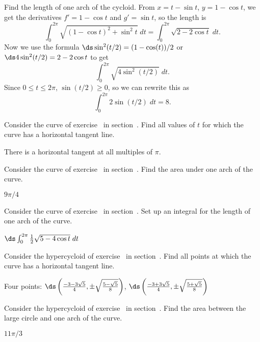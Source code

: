 \begin{example} Find the length of one arch of the cycloid.
From $x=t-\sin t$, $y=1-\cos t$, we get the derivatives
$f'=1-\cos t$ and $g'=\sin t$, so the length is 
$$
  \int_0^{2\pi} \sqrt{(1-\cos t)^2+\sin^2 t}\;dt=
  \int_0^{2\pi} \sqrt{2-2\cos t}\;dt.
$$
Now we use the formula $\ds \sin^2(t/2)=(1-\cos(t))/2$ or
$\ds 4\sin^2(t/2)=2-2\cos t$ to get
$$\int_0^{2\pi} \sqrt{4\sin^2(t/2)}\;dt.$$
Since $0\le t\le2\pi$, $\sin(t/2)\ge 0$, so we can rewrite this as
$$\int_0^{2\pi} 2\sin(t/2)\;dt = 8.$$
\end{example}

\begin{exercises}

\exercise Consider the curve of 
exercise~ in 
section~. Find all values of
$t$ for which the curve has a horizontal tangent line.
\begin{answer} There is a horizontal tangent at all multiples of $\pi$.
\end{answer}

\exercise Consider the curve of 
exercise~ in 
section~. Find the area under
one arch of the curve.
\begin{answer} $9\pi/4$
\end{answer}

\exercise Consider the curve of 
exercise~ in 
section~. Set up an integral
for the length of one arch of the curve.
\begin{answer} $\ds \int_0^{2\pi}{1\over2} \sqrt{5-4\cos t}\;dt$
\end{answer}

\exercise Consider the hypercycloid of 
exercise~ in 
section~. Find all points at
which the curve has a horizontal tangent line.
\begin{answer} Four points:\hfill\break
$\ds \left({-3-3\sqrt5\over4},
\pm\sqrt{5-\sqrt5\over8}\right)$,\hfill\break
$\ds \left({-3+3\sqrt5\over4},
\pm\sqrt{5+\sqrt5\over8}\right)$ 
\end{answer}

\exercise Consider the hypercycloid of 
exercise~ in 
section~. Find the area between the
large circle and
one arch of the curve.
\begin{answer} $11\pi/3$
\end{answer}


\end{exercises}
